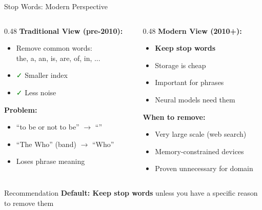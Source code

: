 \documentclass[aspectratio=169]{beamer}
\begin{document}
\begin{frame}[shrink=10]{Stop Words: Modern Perspective}
\begin{columns}
\begin{column}{0.48\textwidth}
\textbf{Traditional View (pre-2010):}
\begin{itemize}
    \item Remove common words: \\
    the, a, an, is, are, of, in, ...
    \item \textcolor{green}{\faCheck } Smaller index
    \item \textcolor{green}{\faCheck } Less noise
\end{itemize}

\vspace{1em}

\textbf{Problem:}
\begin{itemize}
    \item ``to be or not to be'' $\rightarrow$ ``''
    \item ``The Who'' (band) $\rightarrow$ ``Who''
    \item Loses phrase meaning
\end{itemize}
\end{column}

\begin{column}{0.48\textwidth}
\textbf{Modern View (2010+):}
\begin{itemize}
    \item \textbf{Keep stop words}
    \item Storage is cheap
    \item Important for phrases
    \item Neural models need them
\end{itemize}

\vspace{1em}

\textbf{When to remove:}
\begin{itemize}
    \item Very large scale (web search)
    \item Memory-constrained devices
    \item Proven unnecessary for domain
\end{itemize}
\end{column}
\end{columns}

\vspace{1em}

\begin{block}{Recommendation}
\textbf{Default: Keep stop words} unless you have a specific reason to remove them
\end{block}
\end{frame}
\end{document}
